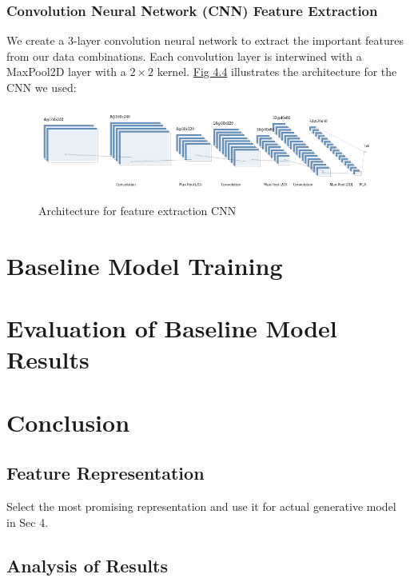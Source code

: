 \documentclass[11pt, a4paper]{report}
\theoremstyle{definition}
\begin{document}
\subsubsection{Convolution Neural Network (CNN) Feature Extraction}
\label{sec:4.3.2.2}
We create a 3-layer convolution neural network to extract the important features from our data combinations. Each convolution layer is interwined with a MaxPool2D layer with a $2\times2$ kernel. \hyperref[fig:cnnarch]{Fig 4.4} illustrates the architecture for the CNN we used:
\begin{figure}[H]
    \includegraphics[scale=0.7]{docs/Project Report/Media/nn.png}
    \caption{Architecture for feature extraction CNN}
    \label{fig:cnnarch}
\end{figure}

\section{Baseline Model Training}

\section{Evaluation of Baseline Model Results}

\section{Conclusion}
\subsection{Feature Representation}
Select the most promising representation and use it for actual generative model in Sec 4.

\subsection{Analysis of Results}

\end{document}
